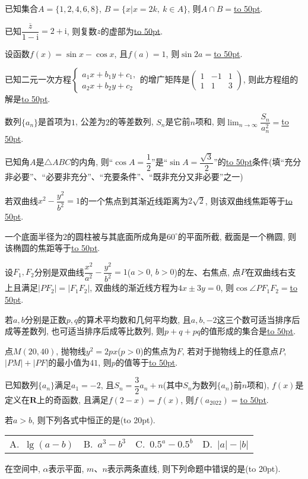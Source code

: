 \documentclass[10pt,a4paper]{article}
\newcommand{\blank}[1]{\underline{\hbox to #1pt{}}}
\newcommand{\bracket}[1]{(\hbox to #1pt{})}
\newcommand{\fourch}[4]{\par\begin{tabular}{p{.23\textwidth}p{.23\textwidth}p{.23\textwidth}p{.23\textwidth}}
A.~#1 &B.~#2& C.~#3& D.~#4
\end{tabular}}
\begin{document}
\item 已知集合$A=\{1,2,4,6,8\}$, $B=\{x|x=2k, \ k\in A\}$, 则$A\cap B=$\blank{50}.
\item 已知$\dfrac{\overline z}{1-\mathrm{i}}=2+\mathrm{i}$, 则复数$z$的虚部为\blank{50}.
\item 设函数$f(x)=\sin x-\cos x$, 且$f(a)=1$, 则$\sin 2a=$\blank{50}.
\item 已知二元一次方程$\begin{cases} a_1x+b_1y+c_1, \\ a_2x+b_2y+c_2 \end{cases}$的增广矩阵是$\begin{pmatrix} 1 & -1 & 1 \\ 1 & 1 & 3\end{pmatrix}$, 则此方程组的解是\blank{50}.
\item 数列$\{a_n\}$是首项为$1$, 公差为$2$的等差数列, $S_n$是它前$n$项和, 则$\displaystyle\lim_{n\to\infty}\dfrac{S_n}{a_n^2}=$\blank{50}.
\item 已知角$A$是$\triangle ABC$的内角, 则``$\cos A=\dfrac 12$''是``$\sin A=\dfrac {\sqrt 3}2$''的\blank{50}条件(填``充分非必要''、``必要非充分''、``充要条件''、``既非充分又非必要''之一)
\item 若双曲线$x^2-\dfrac{y^2}{b^2}=1$的一个焦点到其渐近线距离为$2\sqrt{2}$, 则该双曲线焦距等于\blank{50}.
\item 一个底面半径为$2$的圆柱被与其底面所成角是$60^\circ$的平面所截, 截面是一个椭圆, 则该椭圆的焦距等于\blank{50}.
\item 设$F_1,F_2$分别是双曲线$\dfrac{x^2}{a^2}-\dfrac{y^2}{b^2}=1$($a>0$, $b>0$)的左、右焦点, 点$P$在双曲线右支上且满足$|PF_2|=|F_1F_2|$, 双曲线的渐近线方程为$4x\pm 3y=0$, 则$\cos \angle PF_1F_2=$\blank{50}.
\item 若$a,b$分别是正数$p,q$的算术平均数和几何平均数, 且$a,b,-2$这三个数可适当排序后成等差数列, 也可适当排序后成等比数列, 则$p+q+pq$的值形成的集合是\blank{50}.
\item 点$M(20,40)$, 抛物线$y^2=2px$($p>0$)的焦点为$F$, 若对于抛物线上的任意点$P$, $|PM|+|PF|$的最小值为$41$, 则$p$的值等于\blank{50}.
\item 已知数列$\{a_n\}$满足$a_1=-2$, 且$S_n=\dfrac 32a_n+n$(其中$S_n$为数列$\{a_n\}$前$n$项和), $f(x)$是定义在$\mathbf{R}$上的奇函数, 且满足$f(2-x)=f(x)$, 则$f(a_{2022})=$\blank{50}.
\item 若$a>b$, 则下列各式中恒正的是\bracket{20}.
\fourch{$\lg(a-b)$}{$a^3-b^3$}{$0.5^a-0.5^b$}{$|a|-|b|$}
\item 在空间中, $\alpha$表示平面, $m$、$n$表示两条直线, 则下列命题中错误的是\bracket{20}.
\end{document}

